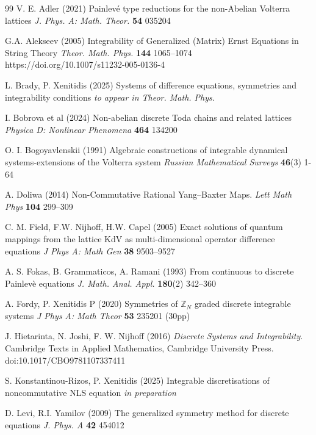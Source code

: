 \documentclass[dvips,10pt]{article}
\theoremstyle{remark} %
\begin{document}
	
	
	\begin{thebibliography}{99}
		 V. E. Adler (2021) Painlev{\'e} type reductions for the non-Abelian Volterra lattices {\emph{J. Phys. A: Math. Theor.}} {\bf{54}} 035204
		
		 G.A. Alekseev (2005) Integrability of Generalized (Matrix) Ernst Equations in String Theory {\emph{Theor. Math. Phys.}} {\bf{144}} 1065--1074 https://doi.org/10.1007/s11232-005-0136-4
		
		 L. Brady, P. Xenitidis (2025) Systems of difference equations, symmetries and integrability conditions {\it{to appear in Theor. Math. Phys.}} 
		
		 I. Bobrova et al (2024) Non-abelian discrete Toda chains and related lattices {\emph{Physica D: Nonlinear Phenomena}} {\bf{464}} 134200
		
		 O. I. Bogoyavlenskii (1991) Algebraic constructions of integrable dynamical systems-extensions of the Volterra system {\emph{Russian Mathematical Surveys}} {\bf{46}}(3) 1-64
		
		 A. Doliwa (2014) Non-Commutative Rational Yang–Baxter Maps. {\emph{Lett Math Phys}} {\bf{104}} 299–309  
		
		 C. M. Field, F.W. Nijhoff, H.W. Capel (2005) Exact solutions of quantum mappings from the lattice KdV as multi-dimensional operator difference equations  {\emph{J Phys A: Math Gen}} {\bf{38}} 9503--9527
		
		 A. S. Fokas, B. Grammaticos, A. Ramani  (1993) From continuous to discrete Painlev\`e equations {\emph{J. Math. Anal. Appl.}} {\bf{180}}(2) 342--360
		
		 A. Fordy, P. Xenitidis P (2020) Symmetries of ${\mathbb{Z}}_{N}$ graded discrete integrable systems {\it J Phys A: Math Theor} {\bf{53}} 235201 (30pp)
		
		 J. Hietarinta, N. Joshi, F. W. Nijhoff (2016) {\emph{Discrete Systems and Integrability}}. Cambridge Texts in Applied Mathematics, Cambridge University Press. doi:10.1017/CBO9781107337411
		
		 S. Konstantinou-Rizos, P. Xenitidis (2025) Integrable discretisations of noncommutative NLS equation  {\it{in preparation}}	
		
		 D. Levi, R.I. Yamilov (2009) The generalized symmetry method for discrete equations {\emph{J. Phys. A}} {\bf{42}} 454012
		

\end{thebibliography}
\end{document}
